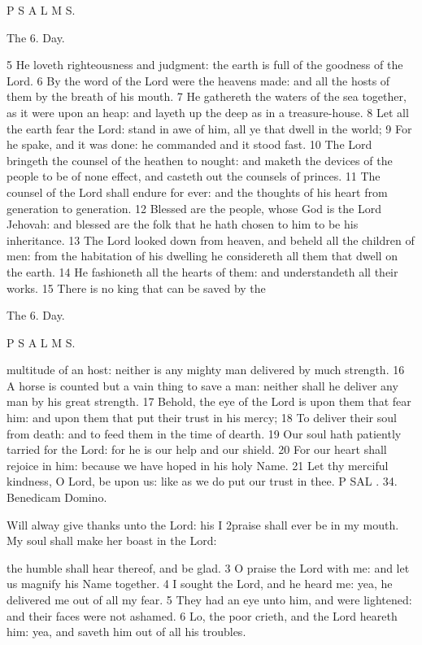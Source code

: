 P S A L M S.

The 6. Day.

5 He loveth righteousness and judgment: the earth is full of the goodness of the Lord. 6 By the word of the Lord were the heavens made: and all the hosts of them by the breath of his mouth. 7 He gathereth the waters of the sea together, as it were upon an heap: and layeth up the deep as in a treasure-house. 8 Let all the earth fear the Lord: stand in awe of him, all ye that dwell in the world; 9 For he spake, and it was done: he commanded and it stood fast. 10 The Lord bringeth the counsel of the heathen to nought: and maketh the devices of the people to be of none effect, and casteth out the counsels of princes. 11 The counsel of the Lord shall endure for ever: and the thoughts of his heart from generation to generation. 12 Blessed are the people, whose God is the Lord Jehovah: and blessed are the folk that he hath chosen to him to be his inheritance. 13 The Lord looked down from heaven, and beheld all the children of men: from the habitation of his dwelling he considereth all them that dwell on the earth. 14 He fashioneth all the hearts of them: and understandeth all their works. 15 There is no king that can be saved by the

The 6. Day.

P S A L M S.

multitude of an host: neither is any mighty man delivered by much strength. 16 A horse is counted but a vain thing to save a man: neither shall he deliver any man by his great strength. 17 Behold, the eye of the Lord is upon them that fear him: and upon them that put their trust in his mercy; 18 To deliver their soul from death: and to feed them in the time of dearth. 19 Our soul hath patiently tarried for the Lord: for he is our help and our shield. 20 For our heart shall rejoice in him: because we have hoped in his holy Name. 21 Let thy merciful kindness, O Lord, be upon us: like as we do put our trust in thee. P SAL . 34. Benedicam Domino.

Will alway give thanks unto the Lord: his I 2praise shall ever be in my mouth. My soul shall make her boast in the Lord:

the humble shall hear thereof, and be glad. 3 O praise the Lord with me: and let us magnify his Name together. 4 I sought the Lord, and he heard me: yea, he delivered me out of all my fear. 5 They had an eye unto him, and were lightened: and their faces were not ashamed. 6 Lo, the poor crieth, and the Lord heareth him: yea, and saveth him out of all his troubles.

